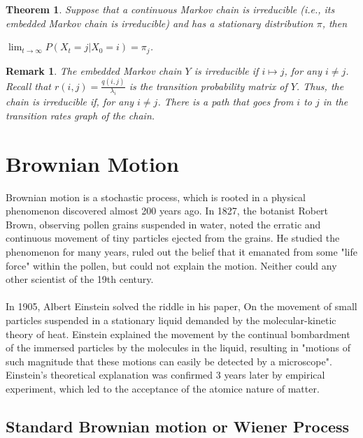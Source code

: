 \documentclass[12pt]{article}
\newtheorem{theorem}{Theorem}
\newtheorem*{remark}{Remark}
\begin{document}
\begin{theorem}
    Suppose that a continuous Markov chain is irreducible (i.e., its embedded Markov chain is irreducible) and has a stationary distribution $\pi$, then
    \begin{center}
        $\lim_{t \to \infty} P(X_t = j | X_0 = i) = \pi_j$.
    \end{center}
\end{theorem}
\begin{remark}
    The embedded Markov chain $Y$ is irreducible if $i \mapsto j$, for any $i \neq j$. Recall that $r(i,j) = \frac{q(i,j)}{\lambda_i}$ is the transition probability matrix of $Y$. Thus, the chain is irreducible if, for any $i \neq j$. There is a path that goes from $i$ to $j$ in the transition rates graph of the chain.
\end{remark}

\section{Brownian Motion}

Brownian motion is a stochastic process, which is rooted in a physical phenomenon discovered almost 200 years ago. In 1827, the botanist Robert Brown, observing pollen grains suspended in water, noted the erratic and continuous movement of tiny particles ejected from the grains. He studied the phenomenon for many years, ruled out the belief that it emanated from some "life force" within the pollen, but could not explain the motion. Neither could any other scientist of the 19th century.
\\
\\In 1905, Albert Einstein solved the riddle in his paper, On the movement of small particles suspended in a stationary liquid demanded by the molecular-kinetic theory of heat. Einstein explained the movement by the continual bombardment of the immersed particles by the molecules in the liquid, resulting in "motions of such magnitude that these motions can easily be detected by a microscope". Einstein's theoretical explanation was confirmed 3 years later by empirical experiment, which led to the acceptance of the atomice nature of matter.

\subsection{Standard Brownian motion or Wiener Process}
\end{document}
